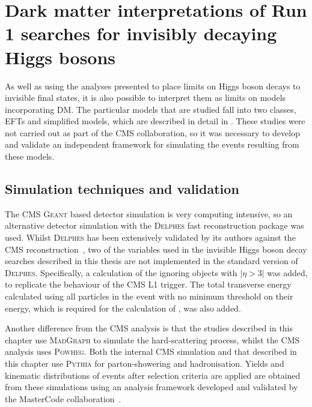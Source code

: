 \chapter{Dark matter interpretations of Run 1 searches for invisibly decaying Higgs bosons}
\label{chap:interp}
As well as using the analyses presented to place limits on Higgs boson decays to invisible final states, it is also possible to interpret them as limits on models incorporating \ac{DM}. The particular models that are studied fall into two classes, \ac{EFT}s and simplified models, which are described in detail in . These studies were not carried out as part of the CMS collaboration, so it was necessary to develop and validate an independent framework for simulating the events resulting from these models.


\section{Simulation techniques and validation}
\label{sec:dmval}
The CMS \textsc{Geant} based detector simulation is very computing intensive, so an alternative detector simulation with the \textsc{Delphes} fast reconstruction package was used. Whilst \textsc{Delphes} has been extensively validated by its authors against the CMS reconstruction~\cite{Favereau2014}, two of the variables used in the invisible Higgs boson decay searches described in this thesis are not implemented in the standard version of \textsc{Delphes}. Specifically, a calculation of the \MET ignoring objects with $|\eta>3|$ was added, to replicate the behaviour of the CMS \ac{L1} trigger. The total transverse energy calculated using all particles in the event with no minimum threshold on their energy, which is required for the calculation of \METsig, was also added.

Another difference from the CMS analysis is that the studies described in this chapter use \textsc{MadGraph} to simulate the hard-scattering process, whilst the CMS analysis uses \textsc{Powheg}. Both the internal CMS simulation and that described in this chapter use \textsc{Pythia} for parton-showering and hadronisation. Yields and kinematic distributions of events after selection criteria are applied are obtained from these simulations using an analysis framework developed and validated by the MasterCode collaboration~\cite{deVries:2015hva}.

